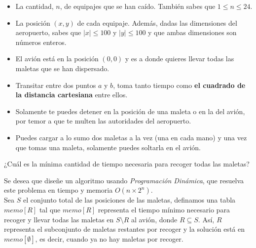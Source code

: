 \documentclass[letterpaper, 12pt]{article}
\begin{document}
\begin{enumerate}
\begin{itemize}
    \item La cantidad, $n$, de equipajes que se han caído. También sabes que $1 \leq n \leq 24$.

    \item La posición $(x, y)$ de cada equipaje. Además, dadas las dimensiones del aeropuerto, sabes que $|x| \leq 100$ y $|y| \leq 100$ y que ambas dimensiones son números enteros.
    \item El avión está en la posición $(0, 0)$ y es a donde quieres llevar todas las maletas que se han dispersado.
    \item Transitar entre dos puntos $a$ y $b$, toma tanto tiempo como \textbf{el cuadrado de la distancia cartesiana} entre ellos.
    \item Solamente te puedes detener en la posición de una maleta o en la del avión, por temor a que te multen las autoridades del aeropuerto.
    \item Puedes cargar a lo sumo dos maletas a la vez (una en cada mano) y una vez que tomas una maleta, solamente puedes soltarla en el avión.
\end{itemize}

¿Cuál es la mínima cantidad de tiempo necesaria para recoger todas las maletas?

Se desea que diseñe un algoritmo usando \emph{Programación Dinámica}, que resuelva este problema en tiempo y memoria $O(n \times 2^n)$. \\

Sea $S$ el conjunto total de las posiciones de las maletas, definamos una tabla $memo[R]$ tal que $memo[R]$ representa el tiempo mínimo necesario para recoger y llevar todas las maletas en $S \setminus R$ al avión, donde $R \subseteq S$. Así, $R$ representa el subconjunto de maletas restantes por recoger y la solución está en $memo[\emptyset]$, es decir, cuando ya no hay maletas por recoger.


\end{enumerate}
\end{document}
